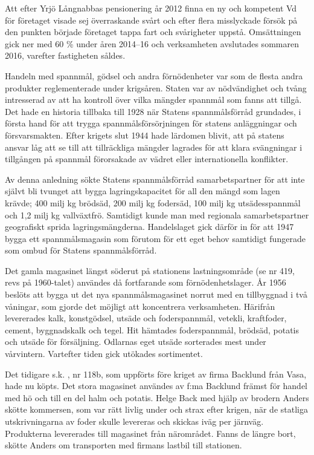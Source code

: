 Att efter Yrjö Långnabbas pensionering år 2012 finna en ny och kompetent Vd för företaget visade sej överraskande svårt och efter flera misslyckade försök på den punkten började företaget tappa fart och svårigheter uppstå. Omsättningen gick ner med 60 \% under åren 2014--16 och verksamheten avslutades sommaren 2016, varefter fastigheten såldes.


Handeln med spannmål, gödsel och andra förnödenheter var som de flesta andra produkter reglementerade under krigsåren. Staten var av nödvändighet och tvång intresserad av att ha kontroll över vilka mängder spannmål som fanns att tillgå. Det hade en historia tillbaka till 1928 när Statens spannmålsförråd grundades, i första hand för att trygga spannmålsförsörjningen för statens anläggningar och försvarsmakten. Efter krigets slut 1944 hade lärdomen blivit, att på statens ansvar låg att se till att tillräckliga mängder lagrades för att klara svängningar i tillgången på spannmål förorsakade av vädret eller internationella konflikter.

Av denna anledning sökte Statens spannmålsförråd samarbetspartner för att inte självt bli tvunget att bygga lagringskapacitet för all den mängd som lagen krävde; 400 milj kg brödsäd, 200 milj kg fodersäd, 100 milj kg utsädesspannmål och 1,2 milj kg vallväxtfrö. Samtidigt kunde man med regionala samarbetspartner geografiskt sprida lagringsmängderna. Handelslaget gick därför in för att 1947 bygga ett spannmålsmagasin som förutom för ett eget behov samtidigt fungerade som ombud för Statens spannmålsförråd.

Det gamla magasinet längst söderut på stationens lastningsområde (se nr 419, revs på 1960-talet) användes då fortfarande som förnödenhetslager. År 1956 beslöts att bygga ut det nya spannmålsmagasinet norrut med en tillbyggnad i två våningar, som gjorde det möjligt att koncentrera verksamheten. Härifrån levererades kalk, konstgödsel, utsäde och foderspannmål, vetekli, kraftfoder, cement, byggnadskalk och tegel. Hit hämtades foderspannmål, brödsäd, potatis och utsäde för försäljning. Odlarnas eget utsäde sorterades mest under vårvintern. Vartefter tiden gick utökades sortimentet.


Det tidigare s.k. , nr 118b, som uppförts före kriget av firma Backlund från Vasa, hade nu köpts. Det stora magasinet användes av f:ma Backlund främst för handel med hö och till en del halm och potatis. Helge Back med hjälp av brodern Anders skötte kommersen, som var rätt livlig under och strax efter krigen, när de statliga utskrivningarna av foder skulle levereras och skickas iväg per järnväg. Produkterna levererades till magasinet från närområdet. Fanns de längre bort, skötte Anders om transporten med firmans lastbil till stationen.

